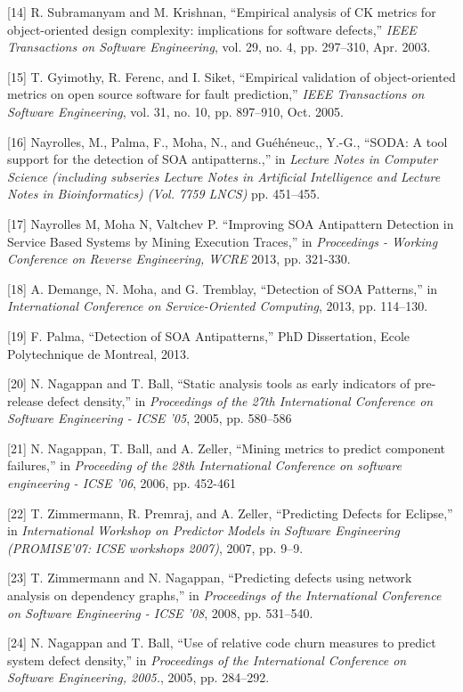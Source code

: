 {[}14{]} R. Subramanyam and M. Krishnan, ``Empirical analysis of CK metrics for object-oriented design complexity: implications for software defects,'' \emph{IEEE Transactions on Software Engineering}, vol. 29, no. 4, pp. 297--310, Apr. 2003.

{[}15{]} T. Gyimothy, R. Ferenc, and I. Siket, ``Empirical validation of object-oriented metrics on open source software for fault prediction,'' \emph{IEEE Transactions on Software Engineering}, vol. 31, no. 10, pp. 897--910, Oct. 2005.

{[}16{]} Nayrolles, M., Palma, F., Moha, N., and Gu{é}h{é}neuc,, Y.-G., ``SODA: A tool support for the detection of SOA antipatterns.,'' in \emph{Lecture Notes in Computer Science (including subseries Lecture Notes in Artificial Intelligence and Lecture Notes in Bioinformatics) (Vol. 7759 LNCS)} pp. 451--455.

{[}17{]} Nayrolles M, Moha N, Valtchev P. ``Improving SOA Antipattern Detection in Service Based Systems by Mining Execution Traces,'' in \emph{Proceedings - Working Conference on Reverse Engineering, WCRE} 2013, pp. 321-330.

{[}18{]} A. Demange, N. Moha, and G. Tremblay, ``Detection of SOA Patterns,'' in \emph{International Conference on Service-Oriented Computing}, 2013, pp. 114--130.

{[}19{]} F. Palma, ``Detection of SOA Antipatterns,'' PhD Dissertation, Ecole Polytechnique de Montreal, 2013.

{[}20{]} N. Nagappan and T. Ball, ``Static analysis tools as early indicators of pre-release defect density,'' in \emph{Proceedings of the 27th International Conference on Software Engineering - ICSE '05}, 2005, pp. 580--586

{[}21{]} N. Nagappan, T. Ball, and A. Zeller, ``Mining metrics to predict component failures,'' in \emph{Proceeding of the 28th
International Conference on software engineering - ICSE '06}, 2006, pp. 452-461

{[}22{]} T. Zimmermann, R. Premraj, and A. Zeller, ``Predicting Defects for Eclipse,'' in \emph{International Workshop on Predictor Models in Software Engineering (PROMISE'07: ICSE workshops 2007)}, 2007, pp. 9--9.

{[}23{]} T. Zimmermann and N. Nagappan, ``Predicting defects using network analysis on dependency graphs,'' in \emph{Proceedings of the International Conference on Software Engineering - ICSE '08}, 2008, pp. 531--540.

{[}24{]} N. Nagappan and T. Ball, ``Use of relative code churn measures to predict system defect density,'' in \emph{Proceedings of the International Conference on Software Engineering, 2005.}, 2005, pp. 284--292.

